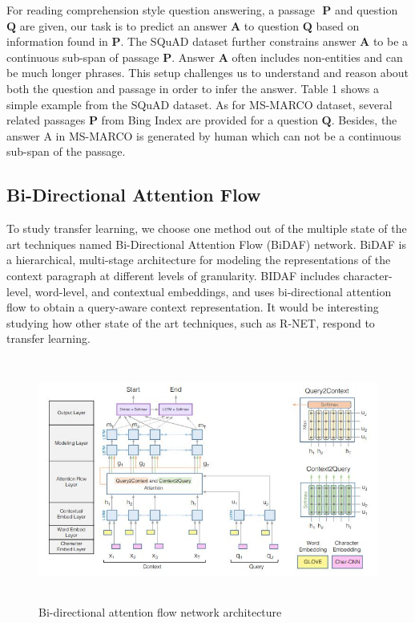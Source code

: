 \documentclass[11pt,a4paper]{article}
\begin{document}
For reading comprehension style question answering, a passage $\textbf{ P}$ and question $\textbf{Q}$ are given, our task is to predict an answer $\textbf{A}$ to question $\textbf{Q}$ based on information found in $\textbf{P}$. The SQuAD dataset further constrains answer$\textbf{ A}$ to be a continuous sub-span of passage $\textbf{P}$. Answer$\textbf{ A}$ often includes non-entities and can be much longer phrases. This setup challenges us to understand and reason about both the question and passage in order to infer the answer. Table 1 shows a simple example from the SQuAD dataset. As for MS-MARCO dataset, several related passages $\textbf{P}$ from Bing Index are provided for a question $\textbf{Q}$. Besides, the answer A in MS-MARCO is generated by human which can not be a continuous sub-span of the passage. 

\subsection{Bi-Directional Attention Flow}
\label{ssec:bidaf}

To study transfer learning, we choose one method out of the multiple state of the art techniques named Bi-Directional Attention Flow (BiDAF) network. BiDAF is a hierarchical, multi-stage architecture for modeling the representations of the context paragraph at different levels of granularity. BIDAF includes character-level, word-level, and contextual embeddings, and uses bi-directional attention flow to obtain a query-aware context representation. It would be interesting studying how other state of the art techniques, such as R-NET, respond to transfer learning.


\begin{figure}
  \includegraphics[width=\textwidth,height=8cm]{bidaf_architecture.JPG}
  \caption{Bi-directional attention flow network architecture}
\end{figure}
\end{document}
